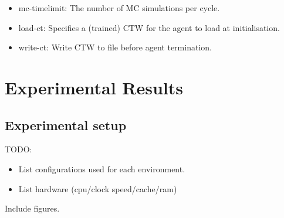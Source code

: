 \documentclass{article}
\begin{document}
\begin{itemize}
    \item mc-timelimit: The number of MC simulations per cycle.
    \item load-ct: Specifies a (trained) CTW for the agent to load at initialisation.
    \item write-ct: Write CTW to file before agent termination.
\end{itemize}


\section{Experimental Results}
\subsection{Experimental setup}
TODO:
\begin{itemize}
    \item List configurations used for each environment.
    \item List hardware (cpu/clock speed/cache/ram)
\end{itemize}

Include figures.
\end{document}

